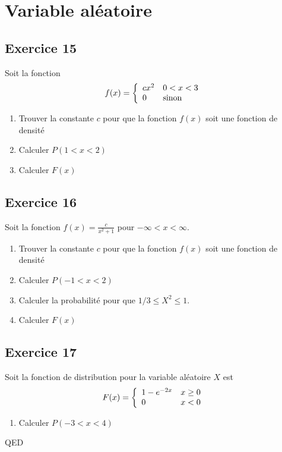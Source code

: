 \documentclass[]{book}
\theoremstyle{definition}
\begin{document}
\section*{Variable al\'eatoire}
\subsection*{Exercice 15}
Soit la fonction
$$
f(x) = \left\{
\begin{array}{l l}
cx^2 & 0 < x < 3 \\
0 & \text{sinon} \\
\end{array}
\right.
$$

\begin{enumerate}
\item Trouver la constante $c$ pour que la fonction $f(x)$ soit une fonction de densit\'e
\item Calculer $P(1 < x < 2)$
\item Calculer $F(x)$
\end{enumerate}

\subsection*{Exercice 16}
Soit la fonction $f(x) = \frac{c}{x^2+1}$ pour $-\infty < x < \infty$.

\begin{enumerate}
\item Trouver la constante $c$ pour que la fonction $f(x)$ soit une fonction de densit\'e
\item Calculer $P(-1 < x < 2)$
\item Calculer la probabilit\'e pour que $1/3 \le X^2 \le 1$.
\item Calculer $F(x)$
\end{enumerate}

\subsection*{Exercice 17}
Soit la fonction de distribution pour la variable al\'eatoire $X$ est
$$
F(x) = \left\{
\begin{array}{l l}
1-e^{-2x} & x \ge 0 \\
0 & x < 0 \\
\end{array}
\right.
$$

\begin{enumerate}
\item Calculer $P(-3 < x < 4)$
\end{enumerate}



QED
\end{document}
